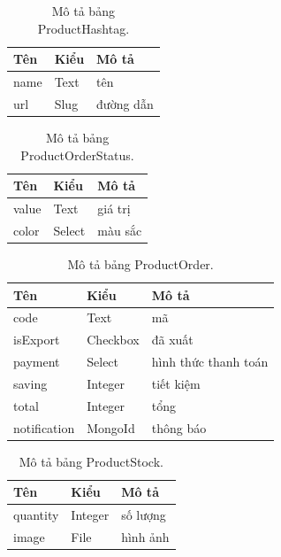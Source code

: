 \documentclass[11pt]{report}
\begin{document}
	
	\begin{table}[h!]
		\begin{center}
			\caption{Mô tả bảng ProductHashtag.}
			\begin{tabular}{ |l|l|l| } 
				\hline
				Tên & Kiểu & Mô tả \\
				\hline
				name & Text & tên \\
				url & Slug & đường dẫn \\
				\hline
			\end{tabular}
			\label{table:ProductHashtag}
		\end{center}
	\end{table}
	
	
	\begin{table}[h!]
		\begin{center}
			\caption{Mô tả bảng ProductOrderStatus.}
			\begin{tabular}{ |l|l|l| } 
				\hline
				Tên & Kiểu & Mô tả \\
				\hline
				value & Text & giá trị \\
				color & Select & màu sắc \\ 
				\hline
			\end{tabular}
			\label{table:ProductOrderStatus}
		\end{center}
	\end{table}
	
	
	\begin{table}[h!]
		\begin{center}
			\caption{Mô tả bảng ProductOrder.}
			\begin{tabular}{ |l|l|l| } 
				\hline
				Tên & Kiểu & Mô tả \\
				\hline
				code & Text & mã \\
				isExport & Checkbox & đã xuất \\
				payment & Select & hình thức thanh toán \\
				saving & Integer & tiết kiệm \\
				total & Integer & tổng \\
				notification & MongoId & thông báo \\ 
				\hline
			\end{tabular}
			\label{table:ProductOrder}
		\end{center}
	\end{table}
	
	
	\begin{table}[h!]
		\begin{center}
			\caption{Mô tả bảng ProductStock.}
			\begin{tabular}{ |l|l|l| } 
				\hline
				Tên & Kiểu & Mô tả \\
				\hline
				quantity & Integer & số lượng \\
				image & File & hình ảnh \\ 
				\hline
			\end{tabular}
			\label{table:ProductStock}
		\end{center}
	\end{table}
	
\end{document}
